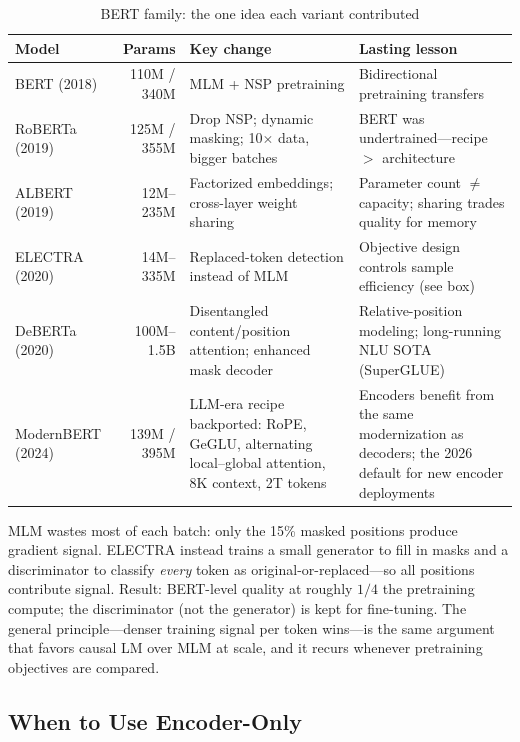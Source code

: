 \begin{table}[H]
\centering
\caption{BERT family: the one idea each variant contributed}
\begin{tabularx}{\textwidth}{lrXX}
\toprule
\textbf{Model} & \textbf{Params} & \textbf{Key change} & \textbf{Lasting lesson} \\
\midrule
BERT (2018) & 110M / 340M & MLM + NSP pretraining & Bidirectional pretraining transfers \\
RoBERTa (2019) & 125M / 355M & Drop NSP; dynamic masking; 10$\times$ data, bigger batches & BERT was undertrained---recipe $>$ architecture \\
ALBERT (2019) & 12M--235M & Factorized embeddings; cross-layer weight sharing & Parameter count $\neq$ capacity; sharing trades quality for memory \\
ELECTRA (2020) & 14M--335M & Replaced-token detection instead of MLM & Objective design controls sample efficiency (see box) \\
DeBERTa (2020) & 100M--1.5B & Disentangled content/position attention; enhanced mask decoder & Relative-position modeling; long-running NLU SOTA (SuperGLUE) \\
ModernBERT (2024) & 139M / 395M & LLM-era recipe backported: RoPE, GeGLU, alternating local--global attention, 8K context, 2T tokens & Encoders benefit from the same modernization as decoders; the 2026 default for new encoder deployments \\
\bottomrule
\end{tabularx}
\end{table}

\begin{keyinsight}
MLM wastes most of each batch: only the 15\% masked positions produce gradient signal. ELECTRA instead trains a small generator to fill in masks and a discriminator to classify \emph{every} token as original-or-replaced---so all positions contribute signal. Result: BERT-level quality at roughly $1/4$ the pretraining compute; the discriminator (not the generator) is kept for fine-tuning. The general principle---denser training signal per token wins---is the same argument that favors causal LM over MLM at scale, and it recurs whenever pretraining objectives are compared.
\end{keyinsight}

\subsection{When to Use Encoder-Only}

